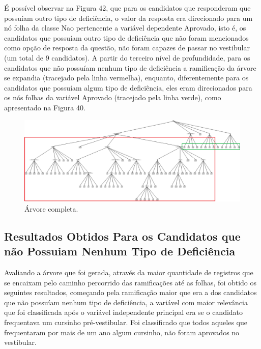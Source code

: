 \par
É possível observar na Figura 42, que para os candidatos que responderam que possuíam outro tipo de deficiência, o valor da resposta era direcionado para um nó folha da classe Nao pertencente a variável dependente Aprovado, isto é, os candidatos que possuíam outro tipo de deficiência que não foram mencionados como opção de resposta da questão, não foram capazes de passar no vestibular (um total de 9 candidatos). A partir do terceiro nível de profundidade, para os candidatos que não possuíam nenhum tipo de deficiência a ramificação da árvore se expandia (tracejado pela linha vermelha), enquanto, diferentemente para os candidatos que possuíam algum tipo de deficiência, eles eram direcionados para os nós folhas da variável Aprovado (tracejado pela linha verde), como apresentado na Figura 40.

\par
\begin{figure}[!htp]
	\begin{center}
    \caption{\label{fig:waveform_fig} Árvore completa.}
	\includegraphics[scale=0.45]{Figuras/Arvore_completa.png}
	\end{center}
\end{figure}


\subsection{Resultados Obtidos Para os Candidatos que não Possuiam Nenhum Tipo de Deficiência}


\par
Avaliando a árvore que foi gerada, através da maior quantidade de registros que se encaixam pelo caminho percorrido das ramificações até as folhas, foi obtido os seguintes resultados, começando pela ramificação maior que era a dos candidatos que não possuíam nenhum tipo de deficiência, a variável com maior relevância que foi classificada após o variável independente principal era se o candidato frequentava um cursinho pré-vestibular. Foi classificado que todos aqueles que frequentaram por mais de um ano algum cursinho, não foram aprovados no vestibular.

